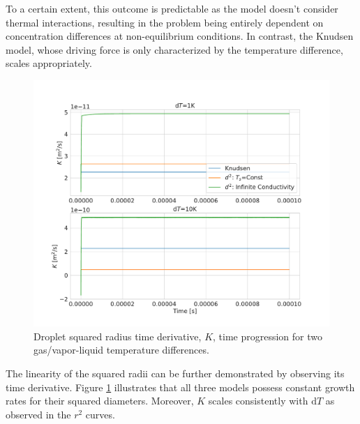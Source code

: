 \documentclass[12pt]{article}
\numberwithin{equation}{section}
\begin{document}
To a certain extent, this outcome is predictable as the model doesn't consider thermal interactions, resulting in the problem being entirely dependent on concentration differences at non-equilibrium conditions. In contrast, the Knudsen model, whose driving force is only characterized by the temperature difference, scales appropriately.
\begin{figure}[H]
    \centering
    \includegraphics[trim={0 30 0 40},clip,width=1.0\textwidth]{Figures/k_sq_hom_vs_D2.pdf}
    \caption{Droplet squared radius time derivative, $K$, time progression for two gas/vapor-liquid temperature differences.}
    \label{f:K_hom_vs_D2}
\end{figure}
The linearity of the squared radii can be further demonstrated by observing its time derivative. Figure \ref{f:K_hom_vs_D2} illustrates that all three models possess constant growth rates for their squared diameters. Moreover, $K$ scales consistently with $\mathrm{d}T$ as observed in the $r^{2}$ curves. 
\end{document}
